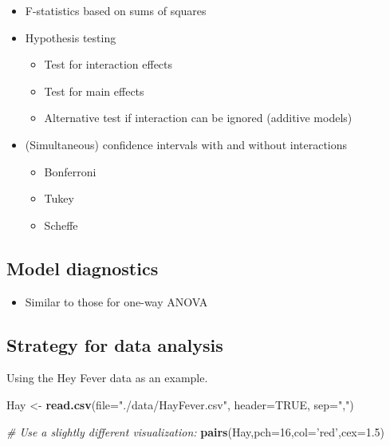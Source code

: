 \documentclass[12pt,]{book}
\newenvironment{Shaded}{\begin{snugshade}}{\end{snugshade}}
\newcommand{\KeywordTok}[1]{\textcolor[rgb]{0.13,0.29,0.53}{\textbf{#1}}}
\newcommand{\DataTypeTok}[1]{\textcolor[rgb]{0.13,0.29,0.53}{#1}}
\newcommand{\DecValTok}[1]{\textcolor[rgb]{0.00,0.00,0.81}{#1}}
\newcommand{\FloatTok}[1]{\textcolor[rgb]{0.00,0.00,0.81}{#1}}
\newcommand{\StringTok}[1]{\textcolor[rgb]{0.31,0.60,0.02}{#1}}
\newcommand{\CommentTok}[1]{\textcolor[rgb]{0.56,0.35,0.01}{\textit{#1}}}
\newcommand{\OtherTok}[1]{\textcolor[rgb]{0.56,0.35,0.01}{#1}}
\newcommand{\NormalTok}[1]{#1}
\providecommand{\tightlist}{%
  \setlength{\itemsep}{0pt}\setlength{\parskip}{0pt}}
\begin{document}
\begin{itemize}
\tightlist
\item
  F-statistics based on sums of squares
\item
  Hypothesis testing

  \begin{itemize}
  \tightlist
  \item
    Test for interaction effects
  \item
    Test for main effects
  \item
    Alternative test if interaction can be ignored (additive models)
  \end{itemize}
\item
  (Simultaneous) confidence intervals with and without interactions

  \begin{itemize}
  \tightlist
  \item
    Bonferroni
  \item
    Tukey
  \item
    Scheffe
  \end{itemize}
\end{itemize}

\subsection{Model diagnostics}\label{model-diagnostics-1}

\begin{itemize}
\tightlist
\item
  Similar to those for one-way ANOVA
\end{itemize}

\subsection{Strategy for data
analysis}\label{strategy-for-data-analysis}

Using the Hey Fever data as an example.

\begin{Shaded}
\begin{Highlighting}[]
\NormalTok{Hay <-}\StringTok{ }\KeywordTok{read.csv}\NormalTok{(}\DataTypeTok{file=}\StringTok{"./data/HayFever.csv"}\NormalTok{, }\DataTypeTok{header=}\OtherTok{TRUE}\NormalTok{, }\DataTypeTok{sep=}\StringTok{","}\NormalTok{)}

\CommentTok{# Use a slightly different visualization:}
\KeywordTok{pairs}\NormalTok{(Hay,}\DataTypeTok{pch=}\DecValTok{16}\NormalTok{,}\DataTypeTok{col=}\StringTok{'red'}\NormalTok{,}\DataTypeTok{cex=}\FloatTok{1.5}\NormalTok{)}
\end{Highlighting}
\end{Shaded}
\end{document}
